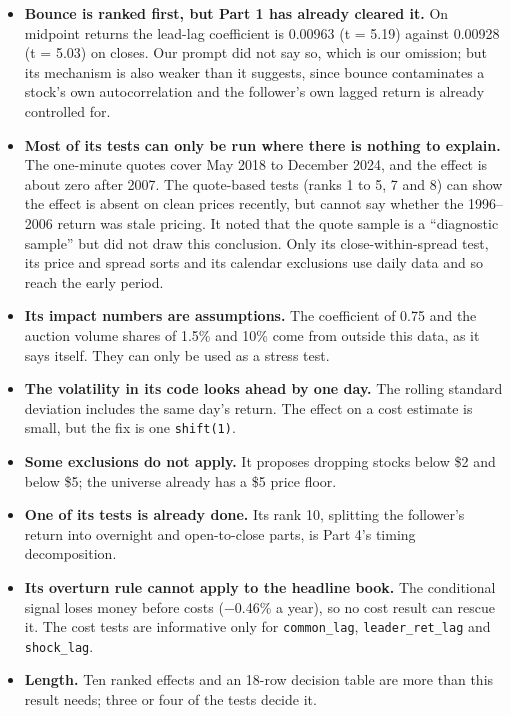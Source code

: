 \begin{itemize}
\tightlist
\item
  \textbf{Bounce is ranked first, but Part 1 has already cleared it.} On midpoint returns the
  lead-lag coefficient is 0.00963 (t = 5.19) against 0.00928 (t = 5.03) on closes. Our
  prompt did not say so, which is our omission; but its mechanism is also weaker than it
  suggests, since bounce contaminates a stock's own autocorrelation and the follower's own
  lagged return is already controlled for.
\item
  \textbf{Most of its tests can only be run where there is nothing to explain.} The one-minute
  quotes cover May 2018 to December 2024, and the effect is about zero after 2007. The
  quote-based tests (ranks 1 to 5, 7 and 8) can show the effect is absent on clean prices
  recently, but cannot say whether the 1996--2006 return was stale pricing. It noted that
  the quote sample is a ``diagnostic sample'' but did not draw this conclusion. Only its
  close-within-spread test, its price and spread sorts and its calendar exclusions use
  daily data and so reach the early period.
\item
  \textbf{Its impact numbers are assumptions.} The coefficient of 0.75 and the auction volume
  shares of 1.5\% and 10\% come from outside this data, as it says itself. They can only
  be used as a stress test.
\item
  \textbf{The volatility in its code looks ahead by one day.} The rolling standard deviation
  includes the same day's return. The effect on a cost estimate is small, but the fix is
  one \texttt{shift(1)}.
\item
  \textbf{Some exclusions do not apply.} It proposes dropping stocks below \$2 and below \$5; the
  universe already has a \$5 price floor.
\item
  \textbf{One of its tests is already done.} Its rank 10, splitting the follower's return into
  overnight and open-to-close parts, is Part 4's timing decomposition.
\item
  \textbf{Its overturn rule cannot apply to the headline book.} The conditional signal loses
  money before costs (−0.46\% a year), so no cost result can rescue it. The cost tests are
  informative only for \texttt{common\_lag}, \texttt{leader\_ret\_lag} and \texttt{shock\_lag}.
\item
  \textbf{Length.} Ten ranked effects and an 18-row decision table are more than this result
  needs; three or four of the tests decide it.
\end{itemize}

